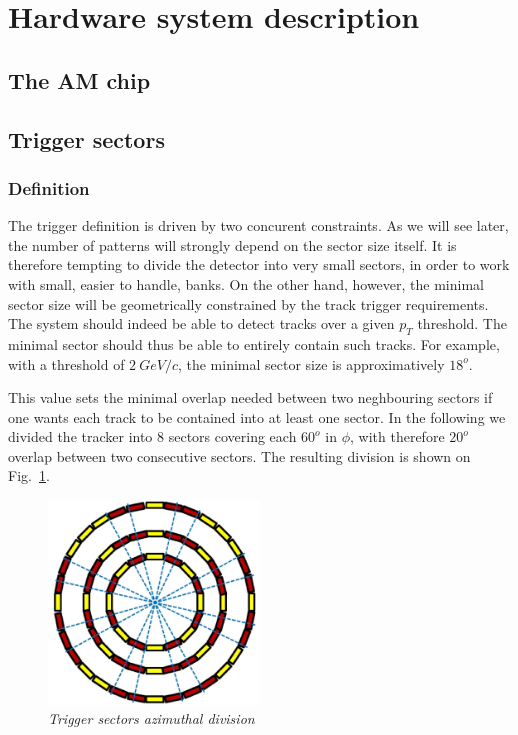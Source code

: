 \section{Hardware system description}

\subsection{The AM chip}

\subsection{Trigger sectors}

\subsubsection{Definition}

\noindent The trigger definition is driven by two concurent constraints. As we will see later, the number of patterns will strongly depend on the sector size itself. It is therefore tempting to divide the detector into very small sectors, in order to work with small, easier to handle, banks. On the other hand, however, the minimal sector size will be geometrically constrained by the track trigger requirements. The system should indeed be able to detect tracks over a given $p_T$ threshold. The minimal sector should thus be able to entirely contain such tracks. For example, with a threshold of $2~GeV/c$, the minimal sector size is approximatively $18^{o}$.

\noindent This value sets the minimal overlap needed between two neghbouring sectors if one wants each track to be contained into at least one sector. In the following we divided the tracker into 8 sectors covering each $60^{o}$ in $\phi$, with therefore $20^{o}$ overlap between two consecutive sectors. The resulting division is shown on Fig.~\ref{fig:SEC_PHI}.

\begin{figure}[ht!]
\centering
\includegraphics[width=0.5\textwidth]{Plots/AzimuthCut.eps}
\caption{\emph{Trigger sectors azimuthal division}}
\label{fig:SEC_PHI}
\end{figure} 

